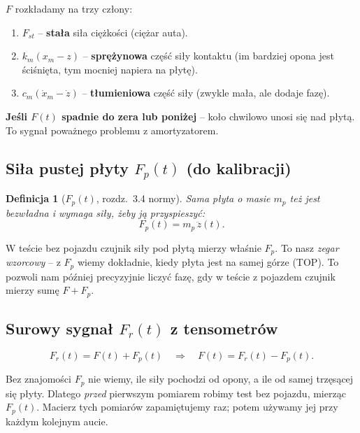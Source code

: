 \documentclass[11pt,a4paper]{article}
\theoremstyle{plainpol}
\newtheorem{definicja}{Definicja}[section]
\begin{document}
\begin{intuicja}
$F$ rozkładamy na trzy człony:
\begin{enumerate}
  \item $F_{st}$ -- \textbf{stała} siła ciężkości (ciężar auta).
  \item $k_m(x_m - z)$ -- \textbf{sprężynowa} część siły kontaktu (im
    bardziej opona jest ściśnięta, tym mocniej napiera na płytę).
  \item $c_m(\dot{x}_m - \dot{z})$ -- \textbf{tłumieniowa} część siły
    (zwykle mała, ale dodaje fazę).
\end{enumerate}
\textbf{Jeśli $F(t)$ spadnie do zera lub poniżej} -- koło chwilowo
unosi się nad płytą. To sygnał poważnego problemu z amortyzatorem.
\end{intuicja}

\subsection{Siła pustej płyty $F_p(t)$ (do kalibracji)}

\begin{definicja}[$F_p(t)$, rozdz.~3.4 normy]
Sama płyta o masie $m_p$ też jest bezwładna i wymaga siły, żeby ją
przyspieszyć:
\begin{equation}
  F_p(t) = m_p\,\ddot{z}(t).
  \label{eq:Fp}
\end{equation}
\end{definicja}

\begin{intuicja}
W teście bez pojazdu czujnik siły pod płytą mierzy właśnie $F_p$. To
nasz \emph{zegar wzorcowy} -- z $F_p$ wiemy dokładnie, kiedy płyta jest
na samej górze (TOP). To pozwoli nam później precyzyjnie liczyć fazę,
gdy w teście z pojazdem czujnik mierzy sumę $F + F_p$.
\end{intuicja}

\subsection{Surowy sygnał $F_r(t)$ z tensometrów}

\begin{equation}
  F_r(t) = F(t) + F_p(t) \quad \Longrightarrow \quad F(t) = F_r(t) - F_p(t).
\end{equation}

\begin{notatka}[title=Po co kalibrować?]
Bez znajomości $F_p$ nie wiemy, ile siły pochodzi od opony, a ile od
samej trzęsącej się płyty. Dlatego \emph{przed} pierwszym pomiarem
robimy test bez pojazdu, mierząc $F_p(t)$. Macierz tych pomiarów
zapamiętujemy raz; potem używamy jej przy każdym kolejnym aucie.
\end{notatka}
\end{document}
